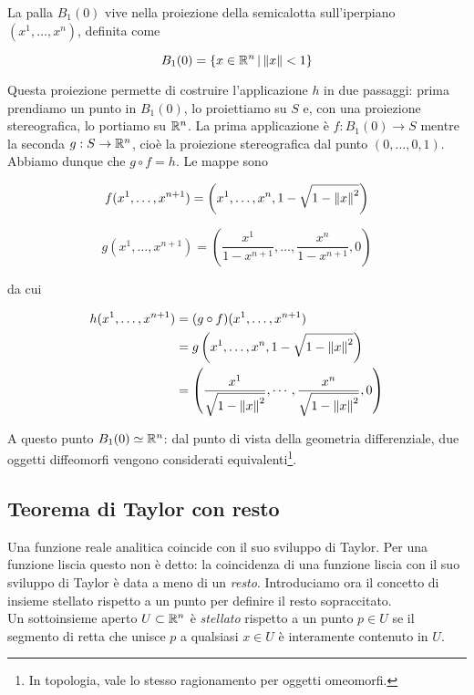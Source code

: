 La palla $ B_{1}(0) $ vive nella proiezione della semicalotta sull'iperpiano $ (x^{1}, \dots, x^{n}) $, definita come

\begin{equation}
	B_{1}(0) = \left\{ x \in \mathbb{R}^{n} \, \middle| \, \norm{x} < 1 \right\}
\end{equation}

Questa proiezione permette di costruire l'applicazione $ h $ in due passaggi: prima prendiamo un punto in $ B_{1}(0) $, lo proiettiamo su $ S $ e, con una proiezione stereografica, lo portiamo su $ \mathbb{R}^{n} $. La prima applicazione è $ f : B_{1}(0) \to S $ mentre la seconda $ g : S \to \mathbb{R}^{n} $, cioè la proiezione stereografica dal punto $ (0,\dots,0,1) $. Abbiamo dunque che $ g \circ f = h $. Le mappe sono

\begin{equation}
	f (x^{1},\dots,x^{n+1}) = \left( x^{1},\dots,x^{n},1-\sqrt{1-\norm{x}^{2}} \right)
\end{equation}

\begin{equation}
	g (x^{1},\dots,x^{n+1}) = \left( \dfrac{x^{1}}{1-x^{n+1}},\dots,\dfrac{x^{n}}{1-x^{n+1}},0 \right)
\end{equation}

da cui

\begin{align}
	\begin{split}
		h (x^{1},\dots,x^{n+1}) &= (g \circ f) (x^{1},\dots,x^{n+1}) \\
		&= g \left( x^{1},\dots,x^{n},1-\sqrt{1-\norm{x}^{2}} \right) \\
		&= \left( \dfrac{x^{1}}{\sqrt{1 - \norm{x}^{2}}}, \cdots, \dfrac{x^{n}}{\sqrt{1 - \norm{x}^{2}}}, 0 \right)
	\end{split}
\end{align}

A questo punto $ B_{1} (0) \simeq \mathbb{R}^{n} $: dal punto di vista della geometria differenziale, due oggetti diffeomorfi vengono considerati equivalenti\footnote{%
	In topologia, vale lo stesso ragionamento per oggetti omeomorfi.%
}.

\subsection{Teorema di Taylor con resto}

Una funzione reale analitica coincide con il suo sviluppo di Taylor. Per una funzione liscia questo non è detto: la coincidenza di una funzione liscia con il suo sviluppo di Taylor è data a meno di un \textit{resto}. Introduciamo ora il concetto di insieme stellato rispetto a un punto per definire il resto sopraccitato. \\
Un sottoinsieme aperto $ U \subset \mathbb{R}^{n} $ è \textit{stellato} rispetto a un punto $ p \in U $ se il segmento di retta che unisce $ p $ a qualsiasi $ x \in U $ è interamente contenuto in $ U $.

